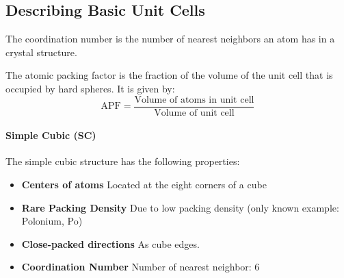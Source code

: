\documentclass[11pt]{report}
\begin{document}
\subsection{Describing Basic Unit Cells}
\begin{definition}
    The coordination number is the number of nearest neighbors an atom has in a crystal structure.
\end{definition}
\begin{definition}
    The atomic packing factor is the fraction of the volume of the unit cell that is occupied by hard spheres. It is given by:
    \begin{equation}
        \text{APF} = \frac{\text{Volume of atoms in unit cell}}{\text{Volume of unit cell}}
    \end{equation}
\end{definition}
\paragraph{Simple Cubic (SC)} The simple cubic structure has the following properties:
\begin{itemize}
    \item \textbf{Centers of atoms} Located at the eight corners of a cube
    \item \textbf{Rare Packing Density}  Due to low packing density (only known example: Polonium, Po)
    \item \textbf{Close-packed directions} As cube edges.
    \item \textbf{Coordination Number} Number of nearest neighbor: 6
\end{itemize}
\end{document}
